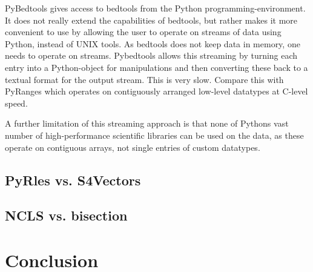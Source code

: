 \documentclass[10pt,letterpaper]{article}
\begin{document}
PyBedtools gives access to bedtools from the Python programming-environment. It
does not really extend the capabilities of bedtools, but rather makes it more
convenient to use by allowing the user to operate on streams of data using
Python, instead of UNIX tools. As bedtools does not keep data in memory, one
needs to operate on streams. Pybedtools allows this streaming by turning each
entry into a Python-object for manipulations and then converting these back to a
textual format for the output stream. This is very slow. Compare this with
PyRanges which operates on contiguously arranged low-level datatypes at C-level
speed.

A further limitation of this streaming approach is that none of Pythons vast
number of high-performance scientific libraries can be used on the data, as
these operate on contiguous arrays, not single entries of custom datatypes.



\subsection*{PyRles vs. S4Vectors}


\subsection*{NCLS vs. bisection}

\section*{Conclusion}






\end{document}
